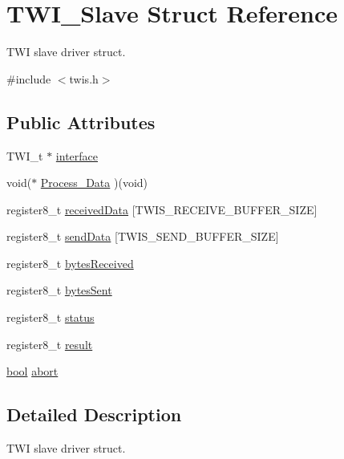 \hypertarget{struct_t_w_i___slave}{\section{T\-W\-I\-\_\-\-Slave Struct Reference}
\label{struct_t_w_i___slave}
}


T\-W\-I slave driver struct.  




{\ttfamily \#include $<$twis.\-h$>$}

\subsection*{Public Attributes}
\begin{DoxyCompactItemize}
\item 
T\-W\-I\-\_\-t $\ast$ \hyperlink{struct_t_w_i___slave_a77840b2d29e959498be84cc3bec0cd22}{interface}
\item 
void($\ast$ \hyperlink{struct_t_w_i___slave_a3b1cd58ff7d3c1ab6112265b652e4356}{Process\-\_\-\-Data} )(void)
\item 
register8\-\_\-t \hyperlink{struct_t_w_i___slave_a8c205728fdea8bcaeaa0f6f889d83d4d}{received\-Data} \mbox{[}T\-W\-I\-S\-\_\-\-R\-E\-C\-E\-I\-V\-E\-\_\-\-B\-U\-F\-F\-E\-R\-\_\-\-S\-I\-Z\-E\mbox{]}
\item 
register8\-\_\-t \hyperlink{struct_t_w_i___slave_aac95534c65dbda49b778a3a05456682d}{send\-Data} \mbox{[}T\-W\-I\-S\-\_\-\-S\-E\-N\-D\-\_\-\-B\-U\-F\-F\-E\-R\-\_\-\-S\-I\-Z\-E\mbox{]}
\item 
register8\-\_\-t \hyperlink{struct_t_w_i___slave_a35d1088ea403c9811886cc3a454d20ff}{bytes\-Received}
\item 
register8\-\_\-t \hyperlink{struct_t_w_i___slave_ae44adb76a49e3ecca8542d10a1d453f8}{bytes\-Sent}
\item 
register8\-\_\-t \hyperlink{struct_t_w_i___slave_af5c33c2e305df38d283d66cdd92d8024}{status}
\item 
register8\-\_\-t \hyperlink{struct_t_w_i___slave_a38f52b1274d890275ae25f68d289c8d8}{result}
\item 
\hyperlink{group__group__xmega__utils_ga97a80ca1602ebf2303258971a2c938e2}{bool} \hyperlink{struct_t_w_i___slave_a9f82420e39d70716410a66dcd3c22c1b}{abort}
\end{DoxyCompactItemize}


\subsection{Detailed Description}
T\-W\-I slave driver struct. 

